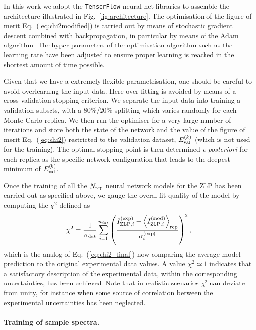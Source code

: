 In this work we adopt the {\tt TensorFlow} neural-net libraries to assemble
the architecture illustrated in  Fig.~\ref{fig:architecture}.
%
The optimisation of the figure of merit Eq.~(\ref{eq:chi2modified}) is carried
out by means of  stochastic gradient descent combined with backpropagation,
in particular by means of the Adam algorithm.
%
The hyper-parameters of the optimisation algorithm such as the learning rate
have been adjusted to ensure proper learning is reached in the shortest amount
of time possible.

Given that we have a extremely flexible parametrisation, one should be careful
to avoid overlearning the input data.
%
Here over-fitting is avoided by means of a cross-validation stopping criterion.
%
We separate the input data into training a validation subsets, with a 80\%/20\% splitting
which varies randomly for each Monte Carlo replica.
%
We then run the optimiser for a very large number of iterations and store both
the state of the network and the value
of the figure of merit Eq.~(\ref{eq:chi2}) restricted to the validation
dataset, $E^{(k)}_{\rm val}$ (which is not used for the training).
%
The optimal stopping point is then determined {\it a posteriori} for each replica
as the specific network configuration that leads to the deepest minimum of $E^{(k)}_{\rm val}$.

Once the training of all the $N_{\rm rep}$ neural network models for the ZLP has been carried
out as specified above, we gauge the overal fit quality of the model by computing the
$\chi^2$ defined as
\begin{equation}
  \label{eq:chi2_final}
\begin{centering}
  \chi^2 = \frac{1}{n_{\rm dat}}\sum_{i=1}^{n_{dat}}\left(\frac{ I_{{\rm ZLP},i}^{{\rm (exp)}} -
 \la I_{{\rm ZLP},i}^{{\rm (mod)}}\ra_{\rm rep} }{\sigma_i^{(\rm exp)}}\right)^2, 
\end{centering}
\end{equation}
which is the analog of Eq.~(\ref{eq:chi2_final}) now comparing the average model prediction
to the original experimental data values.
%
A value $\chi^2 \simeq 1$ indicates that a satisfactory description of the experimental data,
within the corresponding uncertainties, has been achieved.
%
Note that in realistic scenarios $\chi^2$ can deviate from unity, for instance when
some source of correlation between the experimental uncertainties has been neglected.

\paragraph{Training of sample spectra.}


